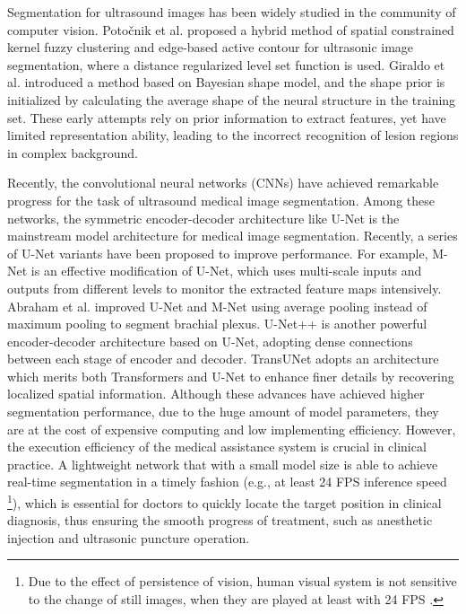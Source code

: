 \documentclass[review]{elsarticle}
\begin{document}
Segmentation for ultrasound images has been widely studied in the community of computer vision. Potočnik et al.\cite{Bozidear2002Automated} proposed a hybrid method of spatial constrained kernel fuzzy clustering and edge-based active contour for ultrasonic image segmentation, where a distance regularized level set function is used. Giraldo et al.\cite{HF2015Peripheral} introduced a method based on Bayesian shape model, and the shape prior is initialized by calculating the average shape of the neural structure in the training set. These early attempts rely on prior information to extract features, yet have limited representation ability, leading to the incorrect recognition of lesion regions in complex background.

Recently, the convolutional neural networks (CNNs) have achieved remarkable progress for the task of ultrasound medical image segmentation\cite{ludeep2021,lubrain2018,2019Deep,2020Low,yo2021wide,sun2020image}. Among these networks, the symmetric encoder-decoder architecture like U-Net\cite{2015U} is the mainstream model architecture for medical image segmentation. Recently, a series of U-Net variants\cite{2019Ultrasound,2019Deep,2018Joint,2020UNet} have been proposed to improve performance. For example, M-Net\cite{2018Joint} is an effective modification of U-Net\cite{2015U}, which uses multi-scale inputs and outputs from different levels to monitor the extracted feature maps intensively. Abraham et al.\cite{2019Deep} improved U-Net\cite{2015U} and M-Net\cite{2018Joint} using average pooling instead of maximum pooling to segment brachial plexus. U-Net++\cite{2020UNet} is another powerful encoder-decoder architecture based on U-Net\cite{2015U}, adopting dense connections between each stage of encoder and decoder. TransUNet\cite{chen2021transunet} adopts an architecture which merits both Transformers\cite{vaswani2017attention} and U-Net\cite{2015U} to enhance finer details by recovering localized spatial information. Although these advances have achieved higher segmentation performance, due to the huge amount of model parameters, they are at the cost of expensive computing and low implementing efficiency. However, the execution efficiency of the medical assistance system is crucial in clinical practice. A lightweight network that with a small model size is able to achieve real-time segmentation in a timely fashion (e.g., at least 24 FPS inference speed \footnote{Due to the effect of persistence of vision, human visual system is not sensitive to the change of still images, when they are played at least with 24 FPS \cite{aneja2019real}.}), which is essential for doctors to quickly locate the target position in clinical diagnosis, thus ensuring the smooth progress of treatment, such as anesthetic injection and ultrasonic puncture operation.
\end{document}
